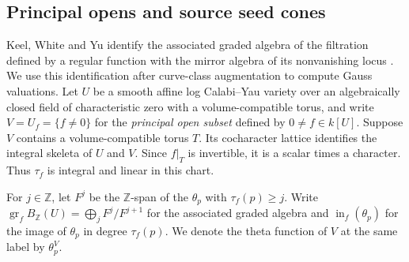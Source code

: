 \documentclass[11pt,reqno]{amsart}
\numberwithin{equation}{section}
\theoremstyle{definition}
\theoremstyle{remark}
\begin{document}
\subsection{Principal opens and source seed cones}

Keel, White and Yu identify the associated graded algebra of the
filtration defined by a regular function with the mirror algebra of
its nonvanishing locus \cite[Corollary~15.3, Remark~15.4 and
Proposition~21.11(1)]{KWY}. We use this identification after
curve-class augmentation to compute Gauss valuations. Let \(U\) be a smooth
affine log Calabi--Yau variety over an algebraically closed field of
characteristic zero with a volume-compatible torus, and
write \(V=U_f=\{f\ne0\}\) for the \emph{principal open subset}
defined by \(0\ne f\in k[U]\). Suppose \(V\) contains a
volume-compatible torus \(T\). Its cocharacter lattice identifies
the integral skeleta of \(U\) and \(V\). Since \(f|_T\) is invertible,
it is a scalar times a character. Thus \(\tau_f\) is integral and
linear in this chart.

For \(j\in\mathbb Z\), let \(F^j\) be the \(\mathbb Z\)-span of the
\(\theta_p\) with \(\tau_f(p)\ge j\). Write
\(\operatorname{gr}_f B_{\mathbb Z}(U)=\bigoplus_j F^j/F^{j+1}\)
for the associated graded algebra and \(\operatorname{in}_f(\theta_p)\)
for the image of \(\theta_p\) in degree \(\tau_f(p)\). We denote the
theta function of \(V\) at the same label by \(\theta_p^V\).
\end{document}
